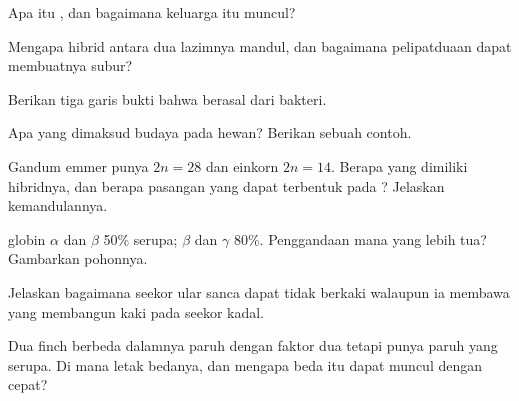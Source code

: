 \begin{exercise}[$\star$]\label{exo:g12:diversification-of-life:2}
Apa itu , dan bagaimana keluarga itu muncul?
\end{exercise}

\begin{exercise}[$\star$]\label{exo:g12:diversification-of-life:3}
Mengapa hibrid antara dua  lazimnya mandul, dan bagaimana
pelipatduaan  dapat membuatnya subur?
\end{exercise}

\begin{exercise}[$\star$]\label{exo:g12:diversification-of-life:4}
Berikan tiga garis bukti bahwa  berasal dari bakteri.
\end{exercise}

\begin{exercise}[$\star$]\label{exo:g12:diversification-of-life:5}
Apa yang dimaksud budaya pada hewan? Berikan sebuah contoh.
\end{exercise}

\begin{exercise}[$\star\star$]\label{exo:g12:diversification-of-life:6}
Gandum emmer punya $2n = 28$ dan einkorn $2n = 14$. Berapa 
yang dimiliki hibridnya, dan berapa pasangan yang dapat terbentuk pada
? Jelaskan kemandulannya.
\end{exercise}

\begin{exercise}[$\star\star$]\label{exo:g12:diversification-of-life:7}
 globin $\alpha$ dan $\beta$ 50\% serupa;  $\beta$ dan $\gamma$
80\%. Penggandaan mana yang lebih tua? Gambarkan pohonnya.
\end{exercise}

\begin{exercise}[$\star\star$]\label{exo:g12:diversification-of-life:8}
Jelaskan bagaimana seekor ular sanca dapat tidak berkaki walaupun ia
membawa  yang membangun kaki pada seekor kadal.
\end{exercise}

\begin{exercise}[$\star\star$]\label{exo:g12:diversification-of-life:9}
Dua  finch berbeda dalamnya paruh dengan faktor dua tetapi punya
 paruh yang serupa. Di mana letak bedanya, dan mengapa beda itu
dapat muncul dengan cepat?
\end{exercise}

